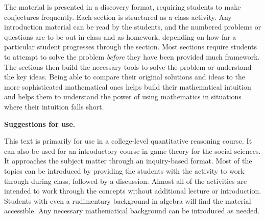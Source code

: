 The material is presented in a discovery format, requiring students to make conjectures frequently. Each section is structured as a class activity. Any introduction material can be read by the students, and the numbered problems or questions are to be out in class and as homework, depending on how far a particular student progresses through the section. Most sections require students to attempt to solve the problem {\it before} they have been provided much framework. The sections then build the necessary tools to solve the problem or understand the key ideas. Being able to compare their original solutions and ideas to the more sophisticated mathematical ones helps build their mathematical intuition and helps them to understand the power of using mathematics in situations where their intuition falls short.

\vspace{.1in}
\noindent
{\bf Suggestions for use.}

This text is primarily for use in a college-level quantitative reasoning course. It can also be used for an introductory course in game theory for the social sciences. It approaches the subject matter through an inquiry-based format.  Most of the topics can be introduced by providing the students with the activity to work through during class, followed by a discussion. Almost all of the activities are intended to work through the concepts without additional lecture or introduction. 
Students with even a rudimentary background in algebra will find the material accessible. Any necessary mathematical background can be introduced as needed. 




